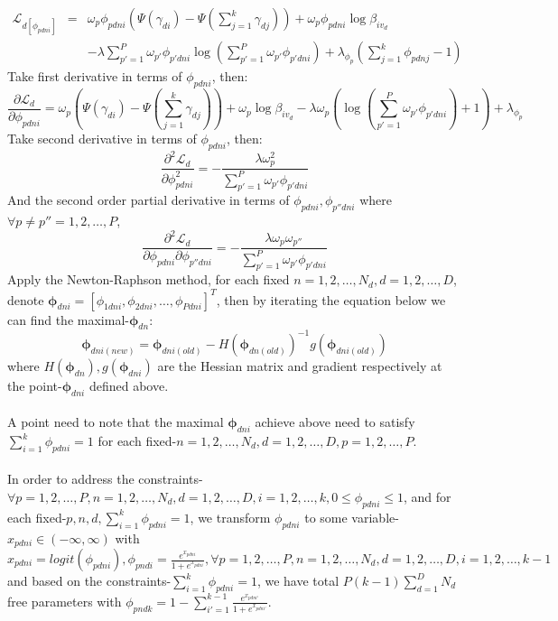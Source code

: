 \documentclass{article}
\newcommand{\be}{\begin{equation}}
\newcommand{\ee}{\end{equation}}
\newcommand{\bs}{\boldsymbol}
\newcommand{\ba}{\begin{array}}
\newcommand{\ea}{\end{array}}
\newcommand{\Sum}{\displaystyle\sum}
\begin{document}
\be\label{phi1}
\ba{rcl}
\mathcal{L}_{d[\phi_{pdni}]}&=&\omega_{p}\phi_{pdni}(\Psi(\gamma_{di})-\Psi(\sum_{j=1}^{k}\gamma_{dj}))+\omega_{p}\phi_{pdni}\log\beta_{iv_d}\\&&-\lambda\Sum_{p'=1}^{P}\omega_{p'}\phi_{p'dni}\log(\sum_{p'=1}^{P}\omega_{p'}\phi_{p'dni})
+\lambda_{\phi_p}(\sum_{j=1}^{k}\phi_{pdnj}-1)
\ea
\ee
Take first derivative in terms of $\phi_{pdni}$, then:\\
\[
\frac{\partial\mathcal{L}_d}{\partial \phi_{pdni}}=\omega_{p}(\Psi(\gamma_{di})-\Psi(\sum_{j=1}^{k}\gamma_{dj}))+\omega_{p}\log\beta_{iv_d}-\lambda\omega_{p}(\log(\sum_{p'=1}^{P}\omega_{p'}\phi_{p'dni})+1)+\lambda_{\phi_p}
\]
Take second derivative in terms of $\phi_{pdni}$, then:\\
\[
\frac{\partial^2\mathcal{L}_d}{\partial \phi^2_{pdni}}=-\frac{\lambda\omega_p^2}{\sum_{p'=1}^{P}\omega_{p'}\phi_{p'dni}}
\]
And the second order partial derivative  in terms of $\phi_{pdni},\phi_{p''dni}$ where $\forall p\neq p''=1,2,\ldots,P$,\\
\[
\frac{\partial^2\mathcal{L}_d}{\partial \phi_{pdni}\partial \phi_{p''dni}}=-\frac{\lambda\omega_p\omega_{p''}}{\sum_{p'=1}^{P}\omega_{p'}\phi_{p'dni}}
\]
Apply the Newton-Raphson method, for each fixed $n=1,2,\ldots,N_d,d=1,2,\ldots,D$, denote $\bs{\phi}_{dni}=[\phi_{1dni},\phi_{2dni},\ldots,\phi_{Pdni}]^T$, then by iterating the equation below we can find the maximal-$\bs{\phi}_{dn}$:\\
\[
\bs{\phi}_{dni(new)}=\bs{\phi}_{dni(old)}-H(\bs{\phi}_{dn(old)})^{-1}g(\bs{\phi}_{dni(old)})
\]
where $H(\bs{\phi}_{dn}),g(\bs{\phi}_{dni})$ are the Hessian matrix and gradient respectively at the point-$\bs{\phi}_{dni}$ defined above.\\
\\
A point need to note that the maximal $\bs{\phi}_{dni}$ achieve above need to satisfy $\Sum_{i=1}^{k}\phi_{pdni}=1$ for each fixed-$n=1,2,\ldots,N_d,d=1,2,\ldots,D,p=1,2,\ldots,P$.\\
\\
In order to address the constraints-$\forall p=1,2,\ldots,P,n=1,2,\ldots,N_d,d=1,2,\ldots,D,i=1,2,\ldots,k, 0\le\phi_{pdni}\le 1$, and for each fixed-$p,n,d,\Sum_{i=1}^{k}\phi_{pdni}=1$, we transform $\phi_{pdni}$ to some variable-$x_{pdni}\in(-\infty,\infty)$ with $x_{pdni}=logit(\phi_{pdni}),\phi_{pndi}=\frac{e^{x_{pdni}}}{1+e^{x_{pdni}}},\forall p
=1,2,\ldots,P,n=1,2,\ldots,N_d,d=1,2,\ldots,D,i=1,2,\ldots,k-1$ and based on the constraints-$\Sum_{i=1}^{k}\phi_{pdni}=1$, we have total $P(k-1)\sum_{d=1}^{D}N_d$ free parameters with $\phi_{pndk}=1-\Sum_{i'=1}^{k-1}\frac{e^{x_{pdni'}}}{1+e^{x_{pdni'}}}$.\\
\end{document}
